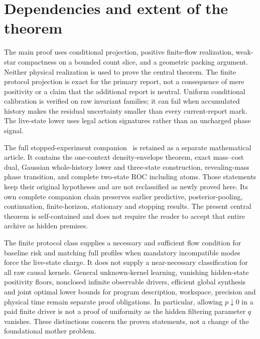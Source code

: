 \section{Dependencies and extent of the theorem}
The main proof uses conditional projection, positive finite-flow realization, weak-star compactness on a bounded count slice, and a geometric packing argument. Neither physical realization is used to prove the central theorem. The finite protocol projection is exact for the primary report, not a consequence of mere positivity or a claim that the additional report is neutral. Uniform conditional calibration is verified on raw invariant families; it can fail when accumulated history makes the residual uncertainty smaller than every current-report mark. The live-state lower uses legal action signatures rather than an uncharged phase signal.

The full stopped-experiment companion~\cite{GTF52} is retained as a separate mathematical article. It contains the one-context density-envelope theorem, exact mass--cost dual, Gaussian whole-history lower and three-state construction, revealing-mass phase transition, and complete two-state ROC including atoms. Those statements keep their original hypotheses and are not reclassified as newly proved here. Its own complete companion chain preserves earlier predictive, posterior-pooling, continuation, finite-horizon, stationary and stopping results. The present central theorem is self-contained and does not require the reader to accept that entire archive as hidden premises.

The finite protocol class supplies a necessary and sufficient flow condition for baseline risk and matching full profiles when mandatory incompatible modes force the live-state charge. It does not supply a near-necessary classification for all raw causal kernels. General unknown-kernel learning, vanishing hidden-state positivity floors, nonclosed infinite observable drivers, efficient global synthesis and joint optimal lower bounds for program description, workspace, precision and physical time remain separate proof obligations. In particular, allowing $p\downarrow0$ in a paid finite driver is not a proof of uniformity as the hidden filtering parameter $q$ vanishes. These distinctions concern the proven statements, not a change of the foundational mother problem.
